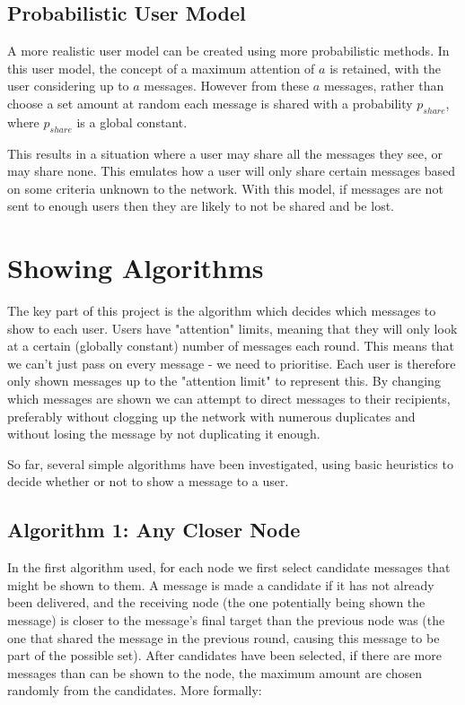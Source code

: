 \documentclass[bsc,frontabs,twoside,singlespacing,parskip,deptreport]{infthesis}     %
\begin{document}
\subsection{Probabilistic User Model}
A more realistic user model can be created using more probabilistic methods. In this user model, the concept of a maximum attention of $a$ is retained, with the user considering up to $a$ messages. However from these $a$ messages, rather than choose a set amount at random each message is shared with a probability $p_{share}$, where $p_{share}$ is a global constant.

This results in a situation where a user may share all the messages they see, or may share none. This emulates how a user will only share certain messages based on some criteria unknown to the network. With this model, if messages are not sent to enough users then they are likely to not be shared and be lost.

\section{Showing Algorithms} \label{sec:showing_algorithms}
The key part of this project is the algorithm which decides which messages to show to each user. Users have "attention" limits, meaning that they will only look at a certain (globally constant) number of messages each round. This means that we can't just pass on every message - we need to prioritise. Each user is therefore only shown messages up to the "attention limit" to represent this. By changing which messages are shown we can attempt to direct messages to their recipients, preferably without clogging up the network with numerous duplicates and without losing the message by not duplicating it enough.

So far, several simple algorithms have been investigated, using basic heuristics to decide whether or not to show a message to a user.

\subsection{Algorithm 1: Any Closer Node}
In the first algorithm used, for each node we first select candidate messages that might be shown to them. A message is made a candidate if it has not already been delivered, and the receiving node (the one potentially being shown the message) is closer to the message's final target than the previous node was (the one that shared the message in the previous round, causing this message to be part of the possible set). After candidates have been selected, if there are more messages than can be shown to the node, the maximum amount are chosen randomly from the candidates. More formally:
\end{document}
